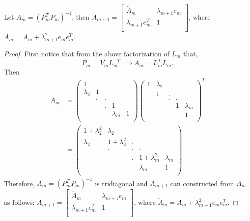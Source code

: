 \documentclass[10pt,a4paper]{article}
\begin{document}
\begin{proposition}
Let $A_m=(P^T_mP_m)^{-1}$, then $A_{m+1}=\left[ \begin{array}{cc}
\tilde{A}_m & \lambda_{m+1}e_m \\
\lambda_{m+1}e^T_m & 1\\
\end{array} \right]$, where $\tilde{A}_m=A_m+\lambda^2_{m+1}e_me^T_m.$
\end{proposition}

\begin{proof}
First notice that from the above factorization of $L_m$ that, 
$$P_m=V_mL^{-T}_m\implies A_m = L^T_mL_m.$$
Then 
\begin{align*}
A_m&=\left( \begin{array}{ccccc}
1 &  &  &  &  \\
\lambda_2 & 1 &  &  &  \\
 & . & . &  &  \\
 &  & . & 1 &  \\
 &  &  & \lambda_m & 1 \\
\end{array} \right)
\left( \begin{array}{ccccc}
1 & \lambda_2 &  &  &  \\
 & 1 & . &  &  \\
 &  & . & . &  \\
 &  &  & 1 & \lambda_m \\
 &  &  &  & 1 \\
\end{array} \right)^T \\
&= \left( \begin{array}{ccccc}
1+\lambda^2_2 & \lambda_2 &  &  &  \\
\lambda_2 & 1+\lambda^2_3 & . &  &  \\
 & . & . & . &  \\
 &  & . & 1+\lambda^2_m & \lambda_m \\
 &  &  & \lambda_m & 1 \\
\end{array} \right)
\end{align*}
Therefore, $A_m=(P^T_mP_m)^{-1}$ is tridiagonal and $A_{m+1}$ can constructed from $A_m$ as follows:
$A_{m+1}=\left[ \begin{array}{cc}
\tilde{A}_m & \lambda_{m+1}e_m \\
\lambda_{m+1}e^T_m & 1\\
\end{array} \right]$, where $\tilde{A}_m=A_m+\lambda^2_{m+1}e_me^T_m.$
\end{proof}
\end{document}
